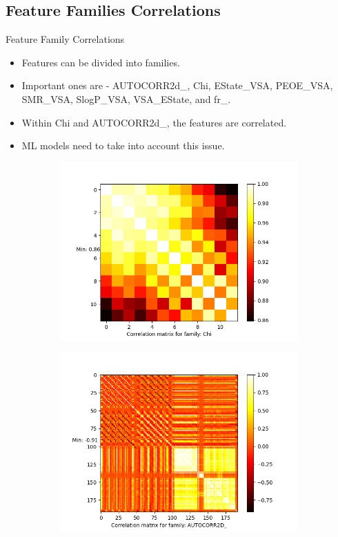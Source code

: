 \documentclass{beamer}
\begin{document}
\subsection{Feature Families Correlations}
\begin{frame}[t]{Feature Family Correlations}
\begin{itemize}
\item Features can be divided into families.
\item Important ones are - AUTOCORR2d\_, Chi, EState\_VSA,  PEOE\_VSA,  SMR\_VSA,  SlogP\_VSA,  VSA\_EState, and fr\_.
\item Within Chi and AUTOCORR2d\_, the features are correlated.
\item ML models need to take into account this issue.
\end{itemize}
\begin{figure}[htb]
    \begin{subfigure}[b]{0.49\textwidth}
         \centering
         \includegraphics[scale=0.25]{images/correlationChi}
        \label{fig:correlationChi}
     \end{subfigure}
     \hfill
    \begin{subfigure}[b]{0.49\textwidth}
         \centering
         \includegraphics[scale=0.25]{images/correlationAUTOCORR2D}

\end{subfigure}
\end{figure}
\end{frame}
\end{document}
